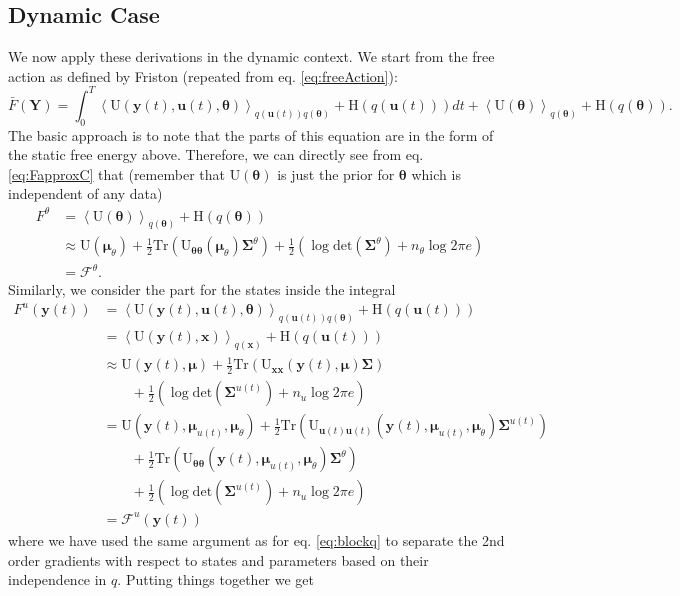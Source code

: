 \documentclass[a4paper,10pt]{article}
\newcommand{\bs}[1]{\mathbf{#1}}					%
\newcommand{\bgs}[1]{\boldsymbol{#1}}				%
\newcommand{\trace}[1]{\mathrm{Tr}\left(#1\right)}					%
\renewcommand{\ss}{u}         %
\newcommand{\so}{y}         %
\newcommand{\sh}{x}         %
\renewcommand{\sp}{\theta}    %
\newcommand{\ps}{\bs{\ss}}    %
\newcommand{\po}{\bs{\so}}    %
\newcommand{\ph}{\bs{\sh}}    %
\newcommand{\pp}{\bgs{\sp}} %
\newcommand{\Po}{\bs{Y}}    %
\newcommand{\E}[2][]{\left\langle #2 \right\rangle_{#1}}	%
\newcommand{\Ent}{\mathrm{H}}			%
\newcommand{\U}{\mathrm{U}}			%
\newcommand{\F}{\mathcal{F}}				%
\newcommand{\Cov}{\bgs{\Sigma}}			%
\renewcommand{\det}[1]{\mathrm{det}(#1)}	%
\begin{document}
\subsection{Dynamic Case}
We now apply these derivations in the dynamic context. We start from the free action as defined by Friston (repeated from eq. \eqref{eq:freeAction}):
\[
    \bar{F}(\Po) = \int_0^T \E[q(\ps(t))q(\pp)]{\U(\po(t),\ps(t),\pp)} + \Ent(q(\ps(t))) dt + \E[q(\pp)]{\U(\pp)} + \Ent(q(\pp)).
\]
The basic approach is to note that the parts of this equation are in the form of the static free energy above. Therefore, we can directly see from eq. \eqref{eq:FapproxC} that (remember that $\U(\pp)$ is just the prior for $\pp$ which is independent of any data)
\begin{align}
    F^\sp &= \E[q(\pp)]{\U(\pp)} + \Ent(q(\pp))\\
    &\approx \U(\bgs{\mu}_\sp) + \frac{1}{2}\trace{\U_{\pp\pp}(\bgs{\mu}_\sp)\Cov^\sp} + \frac{1}{2} \left(\log \det{\Cov^\sp} + n_{\sp} \log 2\pi e\right)\\
    &= \F^\sp.
\end{align}
Similarly, we consider the part for the states inside the integral
\begin{align}
    F^\ss(\po(t)) &= \E[q(\ps(t))q(\pp)]{\U(\po(t),\ps(t),\pp)} + \Ent(q(\ps(t)))\\
    &= \E[q(\ph)]{\U(\po(t),\ph)} + \Ent(q(\ps(t)))\\
    &\approx \U(\po(t),\bgs{\mu}) + \frac{1}{2}\trace{\U_{\ph\ph}(\po(t),\bgs{\mu})\Cov} \nonumber\\
    &\qquad + \frac{1}{2} \left(\log \det{\Cov^{\ss(t)}} + n_{\ss} \log 2\pi e\right)\\
    &= \label{eq:stateFreeAction} \U(\po(t),\bgs{\mu}_{\ss(t)},\bgs{\mu}_\sp) + \frac{1}{2}\trace{\U_{\ps(t)\ps(t)}(\po(t),\bgs{\mu}_{\ss(t)},\bgs{\mu}_\sp)\Cov^{\ss(t)}}\nonumber\\
    &\qquad + \frac{1}{2}\trace{\U_{\pp\pp}(\po(t),\bgs{\mu}_{\ss(t)},\bgs{\mu}_\sp)\Cov^\sp}\nonumber\\ 
    &\qquad + \frac{1}{2} \left(\log \det{\Cov^{\ss(t)}} + n_{\ss} \log 2\pi e\right)\\
    &= \F^\ss(\po(t))
\end{align}
where we have used the same argument as for eq. \eqref{eq:blockq} to separate the 2nd order gradients with respect to states and parameters based on their independence in $q$. Putting things together we get
\end{document}
